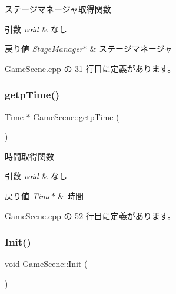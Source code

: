 ステージマネージャ取得関数 


\begin{DoxyParams}{引数}
{\em void} & なし \\
\hline
\end{DoxyParams}

\begin{DoxyRetVals}{戻り値}
{\em Stage\+Manager$\ast$} & ステージマネージャ \\
\hline
\end{DoxyRetVals}


 Game\+Scene.\+cpp の 31 行目に定義があります。

\mbox{\label{class_game_scene_a8f489cb8ef215a3df4806444aa69e869}} 
\subsubsection{\texorpdfstring{getp\+Time()}{getpTime()}}
{\footnotesize\ttfamily \mbox{\hyperlink{class_time}{Time}} $\ast$ Game\+Scene\+::getp\+Time (\begin{DoxyParamCaption}{ }\end{DoxyParamCaption})}



時間取得関数 


\begin{DoxyParams}{引数}
{\em void} & なし \\
\hline
\end{DoxyParams}

\begin{DoxyRetVals}{戻り値}
{\em Time$\ast$} & 時間 \\
\hline
\end{DoxyRetVals}


 Game\+Scene.\+cpp の 52 行目に定義があります。

\mbox{\label{class_game_scene_a0ed06e4578a96910725641fb1a74d958}} 
\subsubsection{\texorpdfstring{Init()}{Init()}}
{\footnotesize\ttfamily void Game\+Scene\+::\+Init (\begin{DoxyParamCaption}{ }\end{DoxyParamCaption})\hspace{0.3cm}{\ttfamily [virtual]}}




